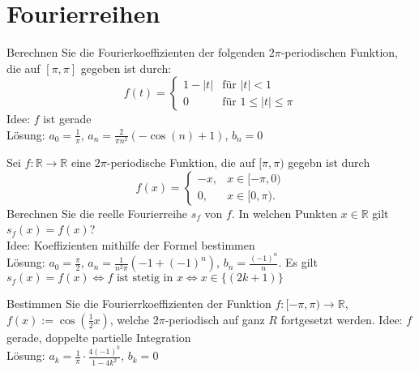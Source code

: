 \section{Fourierreihen}
Berechnen Sie die Fourierkoeffizienten der folgenden $2\pi$-periodischen Funktion, die auf $[\pi, \pi]$ gegeben ist durch:
\begin{displaymath}
  f(t) =
  \begin{cases}
    1 - |t|& \text{für } |t| < 1\\
    0& \text{für } 1 \leq |t| \leq \pi
  \end{cases}
\end{displaymath}
Idee: $f$ ist gerade\\
Lösung: $a_0 = \frac{1}{\pi}$, $a_n = \frac{2}{\pi n^2}(-\cos(n) + 1)$, $b_n = 0$

Sei $f : \mathbb{R} \to \mathbb{R}$ eine $2\pi$-periodische Funktion, die auf $[\pi, \pi)$ gegebn ist durch
\begin{displaymath}
  f(x) =
  \begin{cases}
    -x,& x \in [-\pi,0)\\
    0,& x \in [0,\pi).
  \end{cases}
\end{displaymath}
Berechnen Sie die reelle Fourierreihe $s_f$ von $f$.
In welchen Punkten $x \in \mathbb{R}$ gilt $s_f(x) = f(x)$?\\
Idee: Koeffizienten mithilfe der Formel bestimmen\\
Lösung: $a_0 = \frac{\pi}{2}$, $a_n = \frac{1}{n^2 \pi}(-1 + (-1)^n)$, $b_n = \frac{(-1)^n}{n}$.
Es gilt $s_f(x) = f(x) \iff f \text{ ist stetig in } x \iff x \in \{(2k+1)\}$

Bestimmen Sie die Fourierrkoeffizienten der Funktion $f : [-\pi, \pi) \to \mathbb{R}$, $f(x) := \cos\left(\frac{1}{2}x\right)$, welche $2\pi$-periodisch auf ganz $R$ fortgesetzt werden.
Idee: $f$ gerade, doppelte partielle Integration\\
Lösung: $a_k = \frac{1}{\pi} \cdot \frac{4(-1)^k}{1-4k^2}$, $b_k = 0$